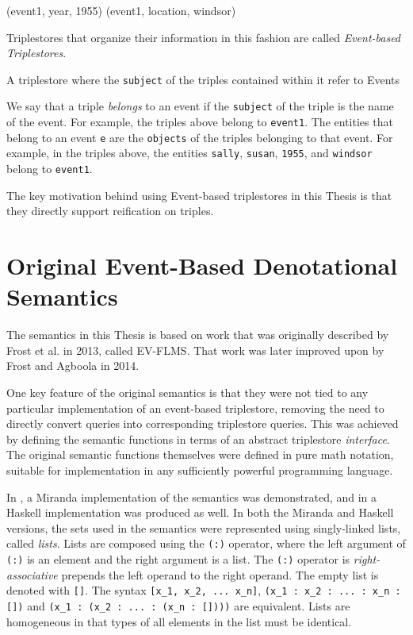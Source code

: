 \documentclass[../main.tex]{subfiles}
\begin{document}
\begin{code}
	(event1, year, 1955)
	(event1, location, windsor)
\end{code}

Triplestores that organize their information in this fashion are called {\em Event-based Triplestores}.

\begin{definition}
	A triplestore where the \texttt{subject} of the triples contained within it refer to Events\cite{frostagboola2014}
\end{definition}

We say that a triple {\em belongs} to an event if the \texttt{subject} of the triple is the name of the event.  For example,
the triples above belong to \texttt{event1}.  The entities that belong to an event \texttt{e} are the \texttt{objects} of the triples belonging to that event.
For example, in the triples above, the entities \texttt{sally}, \texttt{susan}, \texttt{1955}, and \texttt{windsor} belong to \texttt{event1}.

The key motivation behind using Event-based triplestores in this Thesis is that they directly support reification on triples\cite{frostagboola2014}.

\section{Original Event-Based Denotational Semantics}

The semantics in this Thesis is based on work that was originally described by Frost et al. in 2013\cite{frost2013event}, called EV-FLMS.  That work was later improved upon by Frost and Agboola in 2014\cite{frostagboola2014}.

One key feature of the original semantics is that they were not tied to any particular implementation of an event-based triplestore,
removing the need to directly convert queries into corresponding triplestore queries.
This was achieved by defining the semantic functions in terms of an abstract triplestore {\em interface}.
The original semantic functions themselves were defined in pure math notation, suitable for implementation in any sufficiently powerful programming language.

In \cite{frostagboola2014}, a Miranda implementation of the semantics was demonstrated, and in \cite{frost2014denotational} a Haskell
implementation was produced as well.  In both the Miranda and Haskell versions, the sets used in the semantics were represented using
singly-linked lists, called {\em lists}.  Lists are composed using the \texttt{(:)} operator, where the left argument of \texttt{(:)} is an element
and the right argument is a list.  The \texttt{(:)} operator is {\em right-associative} prepends the left operand to the right operand.  The empty list is denoted with
\texttt{[]}.  The syntax \texttt{[x\_1, x\_2, ... x\_n]}, \texttt{(x\_1 : x\_2 : ... : x\_n : [])} and \texttt{(x\_1 : (x\_2 : ... : (x\_n : [])))} are equivalent.
Lists are homogeneous in that types of all elements in the list must be identical.
\end{document}
